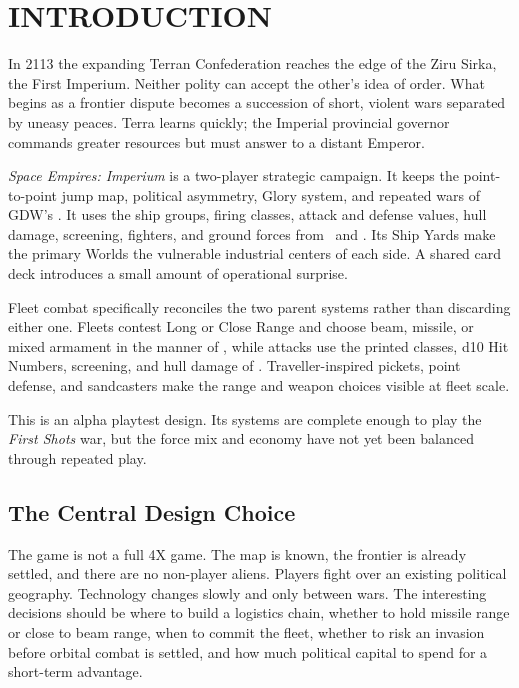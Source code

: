 \section{INTRODUCTION}

In 2113 the expanding Terran Confederation reaches the edge of the Ziru
Sirka, the First Imperium. Neither polity can accept the other's idea of
order. What begins as a frontier dispute becomes a succession of short,
violent wars separated by uneasy peaces. Terra learns quickly; the Imperial
provincial governor commands greater resources but must answer to a distant
Emperor.

\textit{Space Empires: Imperium} is a two-player strategic campaign. It keeps
the point-to-point jump map, political asymmetry, Glory system, and repeated
wars of GDW's \Imperium. It uses the ship groups, firing classes, attack and
defense values, hull damage, screening, fighters, and ground forces from
\SpaceEmpires\ and \CloseEncounters. Its Ship Yards make the primary Worlds
the vulnerable industrial centers of each side. A shared card deck introduces
a small amount of operational surprise.

Fleet combat specifically reconciles the two parent systems rather than
discarding either one. Fleets contest Long or Close Range and choose beam,
missile, or mixed armament in the manner of \Imperium, while attacks use the
printed classes, d10 Hit Numbers, screening, and hull damage of
\SpaceEmpires. Traveller-inspired pickets, point defense, and sandcasters
make the range and weapon choices visible at fleet scale.

This is an alpha playtest design. Its systems are complete enough to play the
\textit{First Shots} war, but the force mix and economy have not yet been
balanced through repeated play.

\subsection{The Central Design Choice}

The game is not a full 4X game. The map is known, the frontier is already
settled, and there are no non-player aliens. Players fight over an existing
political geography. Technology changes slowly and only between wars. The
interesting decisions should be where to build a logistics chain, whether to
hold missile range or close to beam range, when to commit the fleet, whether
to risk an invasion before orbital combat is settled, and how much political
capital to spend for a short-term advantage.

